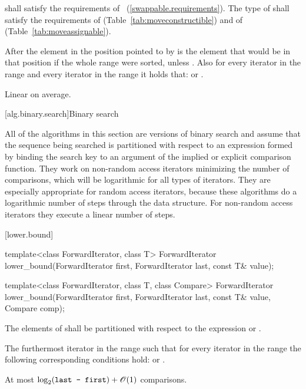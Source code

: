 \begin{itemdescr}
\pnum
\requires
{} shall satisfy the requirements of
~(\ref{swappable.requirements}). The type
of  shall satisfy the requirements of
 (Table~\ref{tab:moveconstructible}) and of
 (Table~\ref{tab:moveassignable}).

\pnum
\effects
After
the element in the position pointed to by 
is the element that would be
in that position if the whole range were sorted, unless .
Also for every iterator
in the range
and every iterator
in the range
it holds that:
or
.

\pnum
\complexity
Linear on average.
\end{itemdescr}

[alg.binary.search]{Binary search}

\pnum
All of the algorithms in this section are versions of binary search
and assume that the sequence being searched is partitioned with respect to
an expression formed by binding the search key to an argument of the
implied or explicit comparison function.
They work on non-random access iterators minimizing the number of comparisons,
which will be logarithmic for all types of iterators.
They are especially appropriate for random access iterators,
because these algorithms do a logarithmic number of steps
through the data structure.
For non-random access iterators they execute a linear number of steps.

[lower.bound]{}

%
\begin{itemdecl}
template<class ForwardIterator, class T>
  ForwardIterator
    lower_bound(ForwardIterator first, ForwardIterator last,
                const T& value);

template<class ForwardIterator, class T, class Compare>
  ForwardIterator
    lower_bound(ForwardIterator first, ForwardIterator last,
                const T& value, Compare comp);
\end{itemdecl}

\begin{itemdescr}
\pnum
\requires
The elements
of
shall be partitioned with respect to the expression
or
.

\pnum
\returns
The furthermost iterator
in the range
such that for every iterator
in the range
the following corresponding conditions hold:
or
.

\pnum
\complexity
At most
$\log_2(\texttt{last - first}) + \mathscr{O}(1)$
comparisons.
\end{itemdescr}

